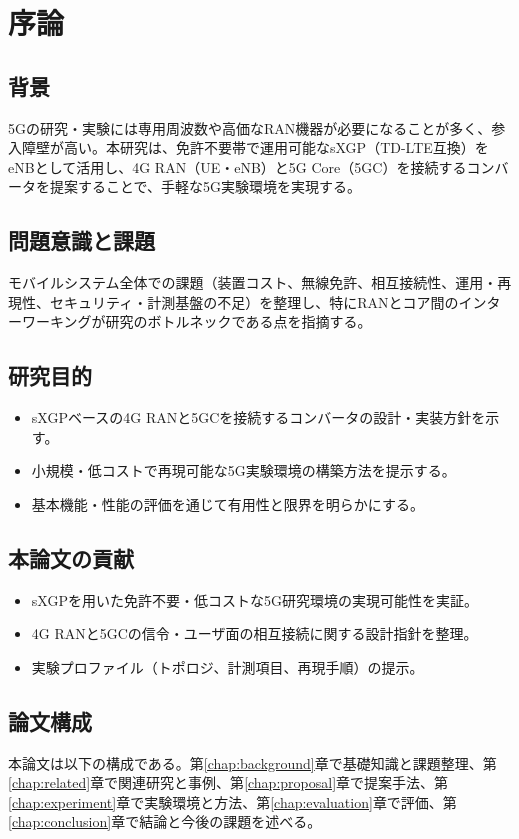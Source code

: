 \chapter{序論}

\section{背景}
5Gの研究・実験には専用周波数や高価なRAN機器が必要になることが多く、参入障壁が高い。本研究は、免許不要帯で運用可能なsXGP（TD-LTE互換）をeNBとして活用し、4G RAN（UE・eNB）と5G Core（5GC）を接続するコンバータを提案することで、手軽な5G実験環境を実現する。

\section{問題意識と課題}
モバイルシステム全体での課題（装置コスト、無線免許、相互接続性、運用・再現性、セキュリティ・計測基盤の不足）を整理し、特にRANとコア間のインターワーキングが研究のボトルネックである点を指摘する。

\section{研究目的}
\begin{itemize}
	\item sXGPベースの4G RANと5GCを接続するコンバータの設計・実装方針を示す。
	\item 小規模・低コストで再現可能な5G実験環境の構築方法を提示する。
	\item 基本機能・性能の評価を通じて有用性と限界を明らかにする。
\end{itemize}

\section{本論文の貢献}
\begin{itemize}
	\item sXGPを用いた免許不要・低コストな5G研究環境の実現可能性を実証。
	\item 4G RANと5GCの信令・ユーザ面の相互接続に関する設計指針を整理。
	\item 実験プロファイル（トポロジ、計測項目、再現手順）の提示。
\end{itemize}

\section{論文構成}
本論文は以下の構成である。第\ref{chap:background}章で基礎知識と課題整理、第\ref{chap:related}章で関連研究と事例、第\ref{chap:proposal}章で提案手法、第\ref{chap:experiment}章で実験環境と方法、第\ref{chap:evaluation}章で評価、第\ref{chap:conclusion}章で結論と今後の課題を述べる。
